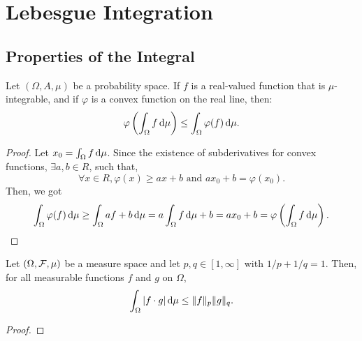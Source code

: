\chapter{Lebesgue Integration}

\section{Properties of the Integral}

\begin{theorem}
	Let $(\Omega,A,\mu)$ be a probability space. If $f$ is a real-valued function that is $\mu$-integrable, and if $\varphi$ is a convex function on the real line, then:
	\begin{equation}
		\varphi\left(\int_{\Omega}f\mathop{}\!\mathrm{d}\mu\right)\leq\int_{\Omega}\varphi(f)\mathop{}\!\mathrm{d}\mu.
	\end{equation}
\end{theorem}

\begin{proof}
	Let $x_{0}=\int_{\Omega}f\mathop{}\!\mathrm{d}\mu$. Since the existence of subderivatives for convex functions, $\exists a,b\in R$, such that,
	\begin{equation*}
		\forall x\in R,\varphi(x)\geq ax+b\text{ and }ax_0+b=\varphi(x_0).
	\end{equation*}
	Then, we got
	\begin{equation*}
		\int_{\Omega}\varphi(f)\mathop{}\!\mathrm{d}\mu\geq\int_{\Omega}af+b\mathop{}\!\mathrm{d}\mu=a\int_{\Omega}f\mathop{}\!\mathrm{d}\mu+b=ax_0+b=\varphi\left(\int_{\Omega}f\mathop{}\!\mathrm{d}\mu\right).
	\end{equation*}
\end{proof}

\begin{theorem} \label{thm:holder-inequality}
	Let $(\Omega,{\mathcal F},\mu)$ be a measure space and let $p,q\in[1,\infty]$ with $1/p+1/q=1$. Then, for all measurable functions $f$ and $g$ on $\Omega$,
	\begin{equation}
		\int_{\Omega}|f\cdot g|\mathop{}\!\mathrm{d}\mu\leq\|f\|_{p}\|g\|_{q}.
	\end{equation}
\end{theorem}

\begin{proof}

\end{proof}

